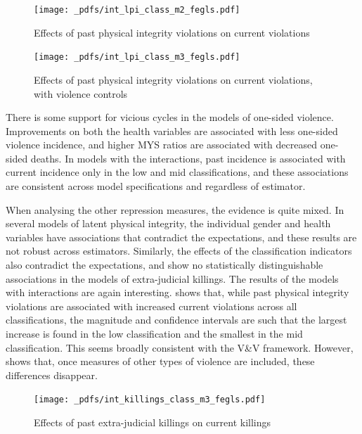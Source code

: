 \documentclass[12pt]{article}
\begin{document}
\begin{figure}[!htb]
    \centering
    \caption{Effects of past physical integrity violations on current violations}
    \label{int_lpi_class}
    \texttt{[image: \_pdfs/int\_lpi\_class\_m2\_fegls.pdf]}
\end{figure}

\begin{figure}[!htb]
    \centering
    \caption{Effects of past physical integrity violations on current violations, with violence controls}
    \label{int_lpi_class_controls}
    \texttt{[image: \_pdfs/int\_lpi\_class\_m3\_fegls.pdf]}
\end{figure}

There is some support for vicious cycles in the models of one-sided violence. Improvements on both the health variables are associated with less one-sided violence incidence, and higher MYS ratios are associated with decreased one-sided deaths. In models with the interactions, past incidence is associated with current incidence only in the low and mid classifications, and these associations are consistent across model specifications and regardless of estimator.

When analysing the other repression measures, the evidence is quite mixed. In several models of latent physical integrity, the individual gender and health variables have associations that contradict the expectations, and these results are not robust across estimators. Similarly, the effects of the classification indicators also contradict the expectations, and show no statistically distinguishable associations in the models of extra-judicial killings.
The results of the models with interactions are again interesting.  shows that, while past physical integrity violations are associated with increased current violations across all classifications, the magnitude and confidence intervals are such that the largest increase is found in the low classification and the smallest in the mid classification. This seems broadly consistent with the V\&V framework. However,  shows that, once measures of other types of violence are included, these differences disappear.

\begin{figure}[!htb]
    \centering
    \caption{Effects of past extra-judicial killings on current killings}
    \label{int_killings_class}
    \texttt{[image: \_pdfs/int\_killings\_class\_m3\_fegls.pdf]}
\end{figure}
\end{document}
